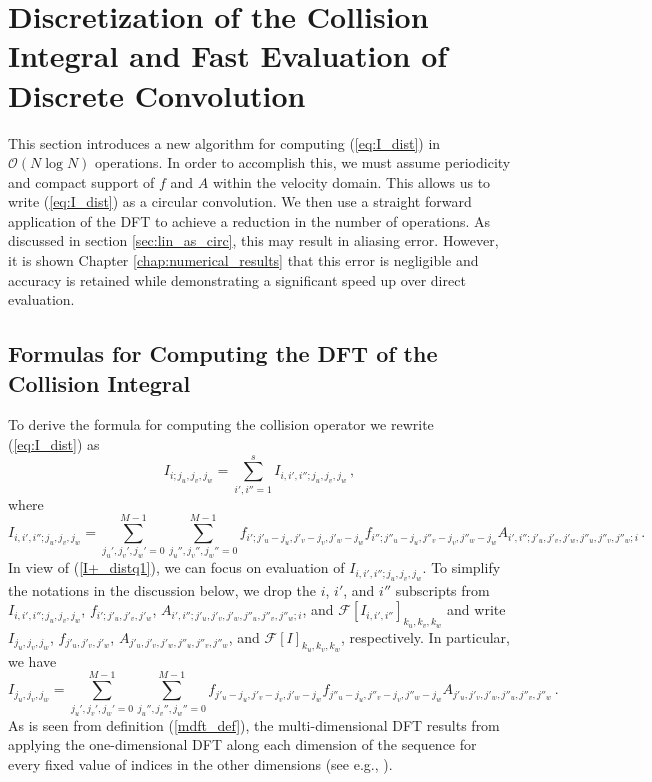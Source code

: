 \documentclass[12pt]{CSUNthesis}
\def\calF{\mathcal{F}}
\begin{document}
\chapter{Discretization of the Collision Integral and Fast Evaluation of Discrete Convolution}
\label{chap:fast_eval}

This section introduces a new algorithm for computing (\ref{eq:I_dist}) in $\mathcal{O}(N\log N)$ operations. In order to accomplish this, we must assume periodicity and compact support of $f$ and $A$ within the velocity domain. This allows us to write (\ref{eq:I_dist}) as a circular convolution.  We then use a straight forward application of the DFT to achieve a reduction in the number of operations. As discussed in section \ref{sec:lin_as_circ}, this may result in aliasing error. However, it is shown Chapter \ref{chap:numerical_results} that this error is negligible and accuracy is retained while demonstrating a significant speed up over direct evaluation.

\section{Formulas for Computing the DFT of the Collision Integral}
To derive the formula for computing the collision operator we rewrite (\ref{eq:I_dist}) as
\begin{equation}
\label{I+_distq1}
I_{i;j_{u},j_{v},j_{w}}= \sum_{i',i''=1}^s I_{i,i',i'';j_{u},j_{v},j_{w}} \, ,
\end{equation}
where 
\begin{equation*}
I_{i,i',i'';j_{u},j_{v},j_{w}}=  \sum_{j_u',j_v',j_w'=0}^{M-1} \sum_{j_u'',j_v'',j_w''=0}^{M-1} f_{i';j'_{u}-j_{u},j'_{v}-j_{v},j'_{w}-j_{w}} f_{i'';j''_{u}-j_{u},j''_{v}-j_{v},j''_{w}-j_{w}} A_{i',i'';j'_{u},j'_{v},j'_{w},j''_u,j''_{v},j''_{w};i}\, .
\end{equation*}
In view of (\ref{I+_distq1}), we can focus on evaluation of $I_{i,i',i'';j_{u},j_{v},j_{w}}$. 
To simplify the notations in the discussion below, we drop the $i$, $i'$, and $i''$ subscripts from 
$I_{i,i',i'';j_{u},j_{v},j_{w}}$, $f_{i';j'_{u},j'_{v},j'_{w}}$, 
$A_{i',i'';j'_{u},j'_{v},j'_{w},j''_u,j''_{v},j''_{w};i}$, and  $\calF[I_{i,i',i''}]_{k_{u},k_{v},k_{w}}$ 
and write $I_{j_u,j_v,j_w}$, $f_{j'_{u},j'_{v},j'_{w}}$, 
$A_{j'_{u},j'_{v},j'_{w},j''_u,j''_{v},j''_{w}}$, and $\calF[I]_{k_{u},k_{v},k_{w}}$, respectively. 
In particular, we have
\begin{equation}
\label{I_all_index}
I_{j_u,j_v,j_w}=  \sum_{j_u',j_v',j_w'=0}^{M-1} \sum_{j_u'',j_v'',j_w''=0}^{M-1}f_{j'_{u}-j_{u},j'_{v}-j_{v},j'_{w}-j_{w}} f_{j''_{u}-j_{u},j''_{v}-j_{v},j''_{w}-j_{w}} A_{j'_{u},j'_{v},j'_{w},j''_u,j''_{v},j''_{w}}\, .
\end{equation}
As is seen from definition (\ref{mdft_def}), the multi-dimensional DFT results from applying the one-dimensional DFT along each dimension of the sequence for every fixed value of indices in the other dimensions (see e.g., \cite{Nussbaumer1982}).
\end{document}
